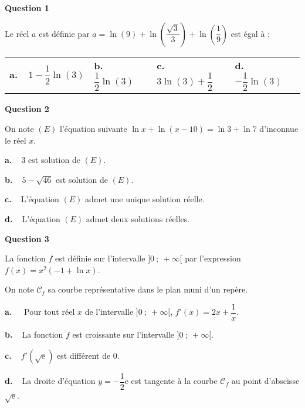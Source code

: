 \documentclass[10pt,a4paper]{article}
\begin{document}
\medskip

\textbf{Question 1}

\medskip

Le réel $a$ est définie par $a = \ln (9) + \ln \left(\dfrac{\sqrt{3}}{3} \right) + \ln \left(\dfrac19 \right)$ est égal à :

\begin{center}
\begin{tabularx}{\linewidth}{*{4}{X}}
\textbf{a.~~}$1 - \dfrac12 \ln (3)$&\textbf{b.~~} $\dfrac12 \ln (3)$&\textbf{c.~~} $3 \ln (3) + \dfrac12$ &\textbf{d.~~} $- \dfrac12 \ln (3)$
\end{tabularx}
\end{center}
 
\medskip

\textbf{Question 2}

\medskip

On note $(E)$ l'équation suivante $\ln x + \ln (x - 10) = \ln 3 + \ln 7$ d'inconnue le réel $x$.

\medskip
\textbf{a.~~}3 est solution de $(E)$.

\textbf{b.~~}$5 - \sqrt{46}$ est solution de $(E)$.

\textbf{c.~~}L'équation $(E)$ admet une unique solution réelle.

\textbf{d.~~}L'équation $(E)$ admet deux solutions réelles.

\medskip

\textbf{Question 3}

\medskip

La fonction $f$ est définie sur l'intervalle $]0~;~+ \infty[$ par l'expression $f(x) = x^2(- 1 + \ln x)$.

On note $\mathcal{C}_f$ sa courbe représentative dans le plan muni d'un repère.

\textbf{a.~~} Pour tout réel $x$ de l'intervalle $]0~;~+ \infty[$, \: $f'(x) = 2x + \dfrac1x$.

\textbf{b.~~}La fonction $f$ est croissante sur l'intervalle $]0~;~+ \infty[$.

\textbf{c.~~}$f'\left(\sqrt{\text{e}} \right)$ est différent de $0$.

\textbf{d.~~}La droite d'équation $y = - \dfrac12 \text{e}$ est tangente à la courbe $\mathcal{C}_f$ au point d'abscisse $\sqrt{\text{e}}$.

\medskip
\end{document}
